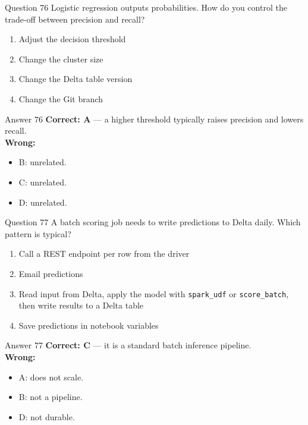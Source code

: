 \documentclass[aspectratio=169,11pt]{beamer}
\begin{document}
\begin{frame}{Question 76}
Logistic regression outputs probabilities. How do you control the trade-off between precision and recall?
\begin{enumerate}[label=\Alph*.]
\item Adjust the decision threshold
\item Change the cluster size
\item Change the Delta table version
\item Change the Git branch
\end{enumerate}
\end{frame}
\begin{frame}{Answer 76}
\textbf{Correct: A} --- a higher threshold typically raises precision and lowers recall.\\
\vspace{0.5em}
\textbf{Wrong:}
\begin{itemize}
\item B: unrelated.
\item C: unrelated.
\item D: unrelated.
\end{itemize}
\end{frame}

\begin{frame}{Question 77}
A batch scoring job needs to write predictions to Delta daily. Which pattern is typical?
\begin{enumerate}[label=\Alph*.]
\item Call a REST endpoint per row from the driver
\item Email predictions
\item Read input from Delta, apply the model with \texttt{spark\_udf} or \texttt{score\_batch}, then write results to a Delta table
\item Save predictions in notebook variables
\end{enumerate}
\end{frame}
\begin{frame}{Answer 77}
\textbf{Correct: C} --- it is a standard batch inference pipeline.\\
\vspace{0.5em}
\textbf{Wrong:}
\begin{itemize}
\item A: does not scale.
\item B: not a pipeline.
\item D: not durable.
\end{itemize}
\end{frame}
\end{document}

